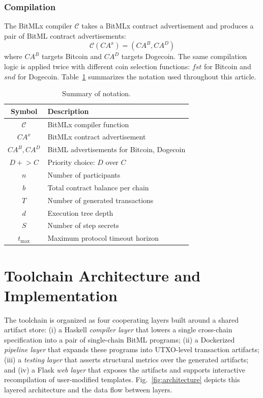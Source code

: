 \documentclass[journal]{IEEEtran}
\begin{document}
\subsubsection{Compilation}

The BitMLx compiler $\mathcal{C}$ takes a BitMLx contract advertisement and produces a pair of BitML contract advertisements:
\begin{equation}
\mathcal{C}(\mathit{CA}^x) = (\mathit{CA}^B, \mathit{CA}^D)
\end{equation}
where $\mathit{CA}^B$ targets Bitcoin and $\mathit{CA}^D$ targets Dogecoin. The same compilation logic is applied twice with different coin selection functions: $\mathit{fst}$ for Bitcoin and $\mathit{snd}$ for Dogecoin. Table~\ref{tab:notation} summarizes the notation used throughout this article.

\begin{table}[t]
\caption{Summary of notation.}
\label{tab:notation}
\centering
\footnotesize
\setlength{\tabcolsep}{4pt}
\begin{tabular}{c>{\RaggedRight\arraybackslash}p{}}
\toprule
Symbol & Description \\
\midrule
$\mathcal{C}$ & BitMLx compiler function \\
$CA^x$ & BitMLx contract advertisement \\
$CA^B, CA^D$ & BitML advertisements for Bitcoin, Dogecoin \\
$D +\!\!> C$ & Priority choice: $D$ over $C$ \\
$n$ & Number of participants \\
$b$ & Total contract balance per chain \\
$T$ & Number of generated transactions \\
$d$ & Execution tree depth \\
$S$ & Number of step secrets \\
$t_{\max}$ & Maximum protocol timeout horizon \\
\bottomrule
\end{tabular}
\end{table}


\section{Toolchain Architecture and Implementation}

The toolchain is organized as four cooperating layers built around a shared artifact store: (i) a Haskell \emph{compiler layer} that lowers a single cross-chain specification into a pair of single-chain BitML programs; (ii) a Dockerized \emph{pipeline layer} that expands these programs into UTXO-level transaction artifacts; (iii) a \emph{testing layer} that asserts structural metrics over the generated artifacts; and (iv) a Flask \emph{web layer} that exposes the artifacts and supports interactive recompilation of user-modified templates. Fig.~\ref{fig:architecture} depicts this layered architecture and the data flow between layers.
\end{document}
